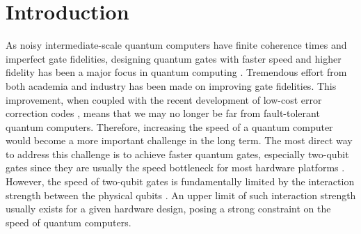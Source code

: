 \documentclass[twocolumn,english,pra,superscriptaddress]{revtex4-1}
\begin{document}
\maketitle
\raggedbottom

\section{Introduction}\vspace{-5pt}
As noisy intermediate-scale quantum computers \cite{Preskill_NISQ,IBM_NISQ} have finite coherence times and imperfect gate fidelities, designing quantum gates with faster speed and higher fidelity has been a major focus in quantum computing  \cite{MIT_Fidelity,Noh2023_Param,Srinivas2021IonGates}. Tremendous effort from both academia and industry has been made on improving gate fidelities. This improvement, when coupled with the recent development of low-cost error correction codes \cite{Breuckmann2021,bravyi2023,xu2023}, means that we may no longer be far from fault-tolerant quantum computers. Therefore, increasing the speed of a quantum computer would become a more important challenge in the long term. The most direct way to address this challenge is to achieve faster quantum gates, especially two-qubit gates since they are usually the speed bottleneck for most hardware platforms \cite{SC_Coupl,NeutralAtom2,FluxmonsCoher}. However, the speed of two-qubit gates is fundamentally limited by the interaction strength between the physical qubits \cite{SpeedLim}. An upper limit of such interaction strength usually exists for a given hardware design, posing a strong constraint on the speed of quantum computers.
\end{document}
